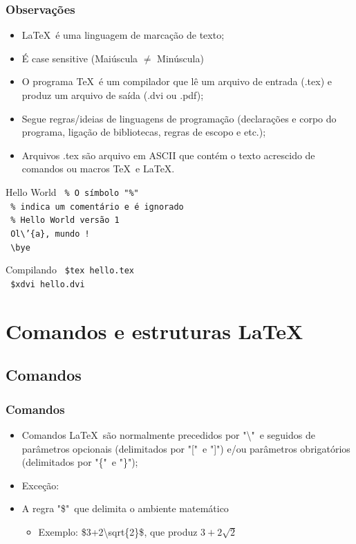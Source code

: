 \documentclass[14pt]{beamer}
\begin{document}
\begin{frame}
  \frametitle{Observações}
  
  \begin{itemize}
    \item <1-> \LaTeX~é uma linguagem de marcação de texto;
    \item <2-> É case sensitive (Maiúscula $\neq$ Minúscula)
    \item <3-> O programa \TeX~é um compilador que lê um arquivo de entrada (.tex) e produz um arquivo de saída (.dvi ou .pdf);
    \item <4-> Segue regras/ideias de linguagens de programação (declarações e corpo do programa, ligação de bibliotecas, regras de escopo e etc.);
 	  \item <5-> Arquivos .tex são arquivo em ASCII que contém o texto acrescido de comandos ou macros \TeX~e \LaTeX.
  \end{itemize}
  
\end{frame}

\begin{frame}[fragile]{Hello World}
  \verb| % O símbolo "%" |\\ 
  \verb| % indica um comentário e é ignorado| \\ 
  \verb| % Hello World versão 1| \\
  \verb| Ol\’{a}, mundo !| \\
  \verb| \bye| \\
    \begin{block}{Compilando}
      \verb| $tex hello.tex |\\
      \verb| $xdvi hello.dvi |
    \end{block}
\end{frame}

\section{Comandos e estruturas \LaTeX}

\subsection{Comandos}

\begin{frame}
  \frametitle{Comandos}
  
  \begin{itemize}
      \item <1-> Comandos \LaTeX~são normalmente precedidos por "\textbackslash"~e seguidos de 
		parâmetros opcionais (delimitados por "["~e "]") e/ou parâmetros 
		obrigatórios (delimitados por "\{"~e "\}");
      \item <2-> Exceção:
      \item <3-> A regra "\$"~que delimita o ambiente matemático
      \begin{itemize}
        \item <4-> Exemplo: \alert{\$3+2\textbackslash sqrt\{2\}\$}, que produz $3+2\sqrt{2}$
      \end{itemize}
  \end{itemize}

\end{frame}
\end{document}
